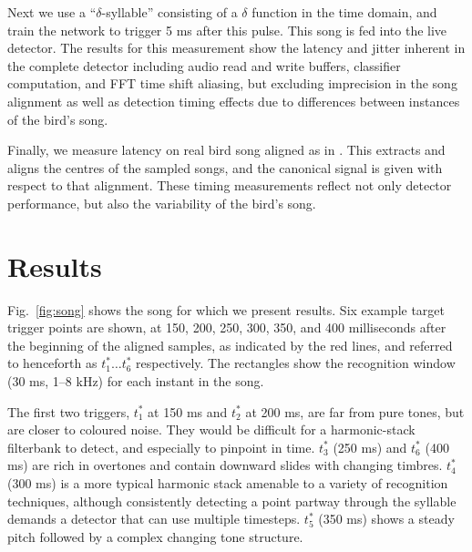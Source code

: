 \documentclass[10pt,letterpaper]{article}
\newcommand\fig[1]{Fig.~\ref{#1}}
\begin{document}
Next we use a ``$\delta$-syllable'' consisting
of a $\delta$ function in the time domain, and train the network to
trigger 5 ms after this pulse.  This song is fed into the live detector.  The results for this measurement show
the latency and jitter inherent in the complete detector
including audio read and write buffers, classifier
computation, and FFT time shift aliasing, but excluding imprecision in the song alignment as well as detection timing effects due to differences between instances of the bird's song.

Finally, we measure latency on real bird song aligned as in \cite{Poole2012}.  This extracts and aligns the centres of the sampled songs, and the canonical signal is given with respect to that alignment.  These timing measurements reflect not only detector performance, but also the variability of the bird's song.

\section{Results}
\label{sec:results}


\fig{fig:song} shows the song for which we present results.  Six example target trigger points are shown, at 150, 200, 250, 300, 350, and 400 milliseconds after the beginning of the aligned samples, as indicated by the red lines, and referred to henceforth as $t^*_1\ldots t^*_6$ respectively.  The rectangles show the recognition window (30 ms, 1--8 kHz) for each instant in the song.

The first two triggers, $t^*_1$ at 150 ms and $t^*_2$ at 200 ms, are far from pure tones, but are closer to coloured noise.  They would be difficult for a harmonic-stack filterbank to detect, and especially to pinpoint in time.  $t^*_3$ (250 ms) and $t^*_6$ (400 ms) are rich in overtones and contain downward slides with changing timbres.  $t^*_4$ (300 ms) is a more typical harmonic stack amenable to a variety of recognition techniques, although consistently detecting a point partway through the syllable demands a detector that can use multiple timesteps.  $t^*_5$ (350 ms) shows a steady pitch followed by a complex changing tone structure.
\end{document}
